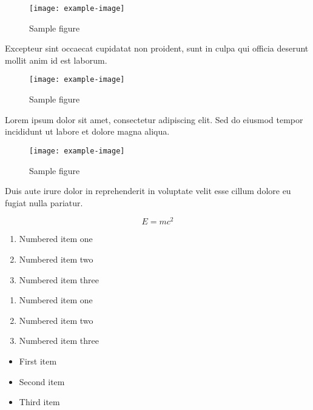 \documentclass{article}
\begin{document}
\begin{figure}[h]
    \centering
    \texttt{[image: example-image]}
    \caption{Sample figure}
    \label{fig:sample}
\end{figure}

Excepteur sint occaecat cupidatat non proident, sunt in culpa qui officia deserunt mollit anim id est laborum.

\begin{figure}[h]
    \centering
    \texttt{[image: example-image]}
    \caption{Sample figure}
    \label{fig:sample}
\end{figure}

Lorem ipsum dolor sit amet, consectetur adipiscing elit. Sed do eiusmod tempor incididunt ut labore et dolore magna aliqua.

\begin{figure}[h]
    \centering
    \texttt{[image: example-image]}
    \caption{Sample figure}
    \label{fig:sample}
\end{figure}

Duis aute irure dolor in reprehenderit in voluptate velit esse cillum dolore eu fugiat nulla pariatur.


\begin{equation}
    E = mc^2
\end{equation}

\begin{enumerate}
\item Numbered item one
\item Numbered item two
\item Numbered item three
\end{enumerate}

\begin{enumerate}
\item Numbered item one
\item Numbered item two
\item Numbered item three
\end{enumerate}

\begin{itemize}
\item First item
\item Second item
\item Third item
\end{itemize}
\end{document}
